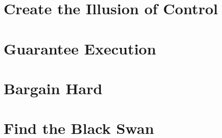 \documentclass{summary}
\begin{document}
\section{Create the Illusion of Control}

\section{Guarantee Execution}

\section{Bargain Hard}

\section{Find the Black Swan}
\end{document}
